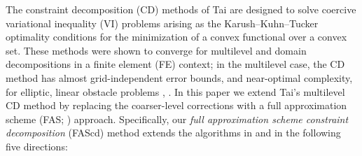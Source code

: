\documentclass[letterpaper,final,12pt,reqno]{amsart}
\theoremstyle{cstyle}
\theoremstyle{cstyle*}
\theoremstyle{dstyle}
\numberwithin{equation}{section}
\numberwithin{figure}{section}
\numberwithin{table}{section}
\numberwithin{theorem}{section}
\newcommand{\pef}[1]{\todo[inline, color=red!20]{PF: #1}}
\begin{document}
The constraint decomposition (CD) methods of Tai \cite{Tai2003} are designed to solve coercive variational inequality (VI) problems arising as the Karush--Kuhn--Tucker optimality conditions for the minimization of a convex functional over a convex set.  These methods were shown to converge for multilevel and domain decompositions in a finite element (FE) context; in the multilevel case, the CD method has almost grid-independent error bounds, and near-optimal complexity, for elliptic, linear obstacle problems \cite[Subsection 5.4]{Tai2003}, \cite[Theorem 4.6 and Algorithm 4.7]{GraeserKornhuber2009}.
In this paper we extend Tai's multilevel CD method by replacing the coarser-level corrections with a full approximation scheme (FAS; \cite{Brandt1977,Bruneetal2015}) approach.  Specifically, our \emph{full approximation scheme constraint decomposition} (FAScd) method extends the algorithms in \cite{GraeserKornhuber2009} and \cite{Tai2003} in the following five directions:
\renewcommand{\labelenumi}{\emph{(\roman{enumi})}}
\end{document}

